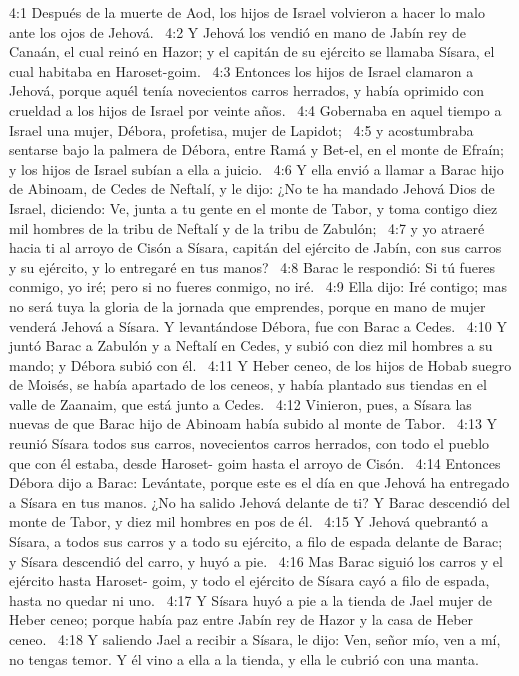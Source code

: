 4:1 Después de la muerte de Aod, los hijos de Israel volvieron a hacer lo malo ante los ojos de Jehová.  
4:2 Y Jehová los vendió en mano de Jabín rey de Canaán, el cual reinó en Hazor; y el capitán de su ejército se llamaba Sísara, el cual habitaba en Haroset-goim.  
4:3 Entonces los hijos de Israel clamaron a Jehová, porque aquél tenía novecientos carros herrados, y había oprimido con crueldad a los hijos de Israel por veinte años.  
4:4 Gobernaba en aquel tiempo a Israel una mujer, Débora, profetisa, mujer de Lapidot;  
4:5 y acostumbraba sentarse bajo la palmera de Débora, entre Ramá y Bet-el, en el monte de Efraín; y los hijos de Israel subían a ella a juicio.  
4:6 Y ella envió a llamar a Barac hijo de Abinoam, de Cedes de Neftalí, y le dijo: ¿No te ha mandado Jehová Dios de Israel, diciendo: Ve, junta a tu gente en el monte de Tabor, y toma contigo diez mil hombres de la tribu de Neftalí y de la tribu de Zabulón;  
4:7 y yo atraeré hacia ti al arroyo de Cisón a Sísara, capitán del ejército de Jabín, con sus carros y su ejército, y lo entregaré en tus manos?  
4:8 Barac le respondió: Si tú fueres conmigo, yo iré; pero si no fueres conmigo, no iré.  
4:9 Ella dijo: Iré contigo; mas no será tuya la gloria de la jornada que emprendes, porque en mano de mujer venderá Jehová a Sísara. Y levantándose Débora, fue con Barac a Cedes.  
4:10 Y juntó Barac a Zabulón y a Neftalí en Cedes, y subió con diez mil hombres a su mando; y Débora subió con él.  
4:11 Y Heber ceneo, de los hijos de Hobab suegro de Moisés, se había apartado de los ceneos, y había plantado sus tiendas en el valle de Zaanaim, que está junto a Cedes.  
4:12 Vinieron, pues, a Sísara las nuevas de que Barac hijo de Abinoam había subido al monte de Tabor.  
4:13 Y reunió Sísara todos sus carros, novecientos carros herrados, con todo el pueblo que con él estaba, desde Haroset- goim hasta el arroyo de Cisón.  
4:14 Entonces Débora dijo a Barac: Levántate, porque este es el día en que Jehová ha entregado a Sísara en tus manos. ¿No ha salido Jehová delante de ti? Y Barac descendió del monte de Tabor, y diez mil hombres en pos de él.  
4:15 Y Jehová quebrantó a Sísara, a todos sus carros y a todo su ejército, a filo de espada delante de Barac; y Sísara descendió del carro, y huyó a pie.  
4:16 Mas Barac siguió los carros y el ejército hasta Haroset- goim, y todo el ejército de Sísara cayó a filo de espada, hasta no quedar ni uno.  
4:17 Y Sísara huyó a pie a la tienda de Jael mujer de Heber ceneo; porque había paz entre Jabín rey de Hazor y la casa de Heber ceneo.  
4:18 Y saliendo Jael a recibir a Sísara, le dijo: Ven, señor mío, ven a mí, no tengas temor. Y él vino a ella a la tienda, y ella le cubrió con una manta.  
